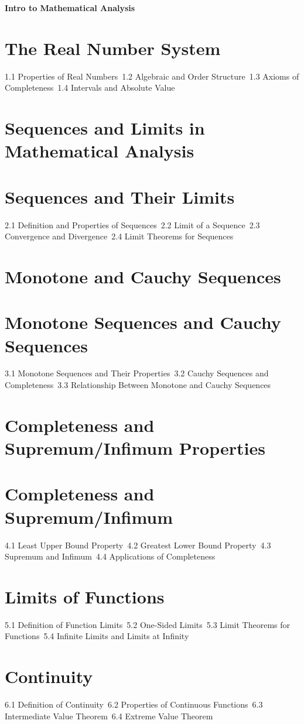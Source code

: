 {\LARGE \bf{Intro to Mathematical Analysis}}
\section{The Real Number System}
1.1 Properties of Real Numbers\
1.2 Algebraic and Order Structure\
1.3 Axioms of Completeness\
1.4 Intervals and Absolute Value\
\section{Sequences and Limits in Mathematical Analysis}
\section{Sequences and Their Limits}
2.1 Definition and Properties of Sequences\
2.2 Limit of a Sequence\
2.3 Convergence and Divergence\
2.4 Limit Theorems for Sequences\
\section{Monotone and Cauchy Sequences}
\section{Monotone Sequences and Cauchy Sequences}
3.1 Monotone Sequences and Their Properties\
3.2 Cauchy Sequences and Completeness\
3.3 Relationship Between Monotone and Cauchy Sequences\
\section{Completeness and Supremum/Infimum Properties}
\section{Completeness and Supremum/Infimum}
4.1 Least Upper Bound Property\
4.2 Greatest Lower Bound Property\
4.3 Supremum and Infimum\
4.4 Applications of Completeness\
\section{Limits of Functions}
5.1 Definition of Function Limits\
5.2 One-Sided Limits\
5.3 Limit Theorems for Functions\
5.4 Infinite Limits and Limits at Infinity\
\section{Continuity}
6.1 Definition of Continuity\
6.2 Properties of Continuous Functions\
6.3 Intermediate Value Theorem\
6.4 Extreme Value Theorem\
